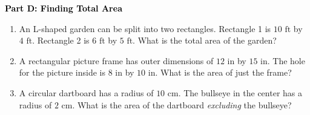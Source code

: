 \documentclass[12pt, letterpaper, fleqn]{article}
\newcommand{\blanklong}{\underline{\hspace{6.5cm}}}
\begin{document}
\newpage

\begin{tcolorbox}[colback=customteal!20]
\large\textcolor{black}{\textbf{Part D: Finding Total Area}}
\end{tcolorbox}

\vspace{3mm}

\begin{enumerate}[itemsep=2.5cm, leftmargin=0.6cm, resume]
\begin{itemize}
\item Area of Semicircle: \blanklong
\item Challenge: Total Area: \blanklong
\end{itemize}
\item An L-shaped garden can be split into two rectangles. Rectangle 1 is $10\text{ ft}$ by $4\text{ ft}$. Rectangle 2 is $6\text{ ft}$ by $5\text{ ft}$. What is the total area of the garden?
\item A rectangular picture frame has outer dimensions of $12\text{ in}$ by $15\text{ in}$. The hole for the picture inside is $8\text{ in}$ by $10\text{ in}$. What is the area of just the frame?
\item A circular dartboard has a radius of $10\text{ cm}$. The bullseye in the center has a radius of $2\text{ cm}$. What is the area of the dartboard \textit{excluding} the bullseye?
\end{enumerate}
\end{document}
